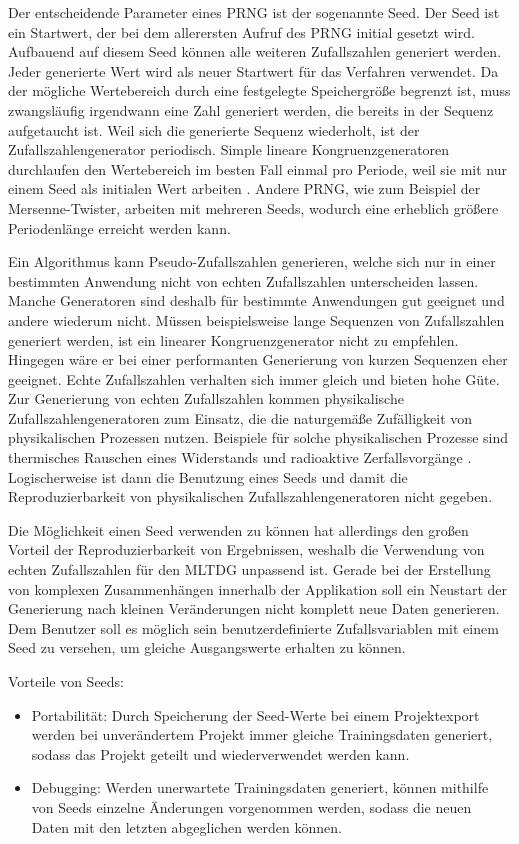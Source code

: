 Der entscheidende Parameter eines \ac{PRNG} ist der sogenannte Seed. Der Seed ist ein Startwert, der bei dem allerersten Aufruf des \ac{PRNG} initial gesetzt wird. Aufbauend auf diesem Seed können alle weiteren Zufallszahlen generiert werden. Jeder generierte Wert wird als neuer Startwert für das Verfahren verwendet. Da der mögliche Wertebereich durch eine festgelegte Speichergröße begrenzt ist, muss zwangsläufig irgendwann eine Zahl generiert werden, die bereits in der Sequenz aufgetaucht ist. Weil sich die generierte Sequenz wiederholt, ist der Zufallszahlengenerator periodisch. Simple lineare Kongruenzgeneratoren durchlaufen den Wertebereich im besten Fall einmal pro Periode, weil sie mit nur einem Seed als initialen Wert arbeiten \cite{prng}. Andere \ac{PRNG}, wie zum Beispiel der Mersenne-Twister, arbeiten mit mehreren Seeds, wodurch eine erheblich größere Periodenlänge erreicht werden kann.

Ein Algorithmus kann Pseudo-Zufallszahlen generieren, welche sich nur in einer bestimmten Anwendung nicht von echten Zufallszahlen unterscheiden lassen. Manche Generatoren sind deshalb für bestimmte Anwendungen gut geeignet und andere wiederum nicht. Müssen beispielsweise lange Sequenzen von Zufallszahlen generiert werden, ist ein linearer Kongruenzgenerator nicht zu empfehlen. Hingegen wäre er bei einer performanten Generierung von kurzen Sequenzen eher geeignet. Echte Zufallszahlen verhalten sich immer gleich und bieten hohe Güte. Zur Generierung von echten Zufallszahlen kommen physikalische Zufallszahlengeneratoren zum Einsatz, die die naturgemäße Zufälligkeit von physikalischen Prozessen nutzen. Beispiele für solche physikalischen Prozesse sind thermisches Rauschen eines Widerstands und radioaktive Zerfallsvorgänge \cite{prng}. Logischerweise ist dann die Benutzung eines Seeds und damit die Reproduzierbarkeit von physikalischen Zufallszahlengeneratoren nicht gegeben.

Die Möglichkeit einen Seed verwenden zu können hat allerdings den großen Vorteil der Reproduzierbarkeit von Ergebnissen, weshalb die Verwendung von echten Zufallszahlen für den \ac{MLTDG} unpassend ist. Gerade bei der Erstellung von komplexen Zusammenhängen innerhalb der Applikation soll ein Neustart der Generierung nach kleinen Veränderungen nicht komplett neue Daten generieren. Dem Benutzer soll es möglich sein benutzerdefinierte Zufallsvariablen mit einem Seed zu versehen, um gleiche Ausgangswerte erhalten zu können.

Vorteile von Seeds:
\begin{itemize}
    \item Portabilität: Durch Speicherung der Seed-Werte bei einem Projektexport werden bei unverändertem Projekt immer gleiche Trainingsdaten generiert, sodass das Projekt geteilt und wiederverwendet werden kann. 
    \item Debugging: Werden unerwartete Trainingsdaten generiert, können mithilfe von Seeds einzelne Änderungen vorgenommen werden, sodass die neuen Daten mit den letzten abgeglichen werden können.
\end{itemize}

